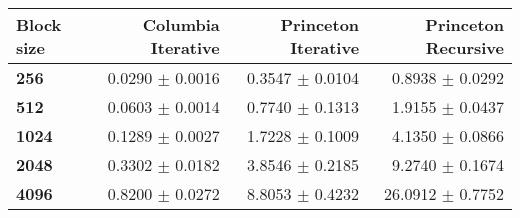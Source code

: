\begin{tabular}{lrrr}\toprule
\textbf{Block size}  & \textbf{Columbia Iterative} & \textbf{Princeton Iterative} & \textbf{Princeton Recursive}\\\midrule
\textbf{256}  & 0.0290 $\pm$ 0.0016 & 0.3547 $\pm$ 0.0104 & 0.8938 $\pm$ 0.0292\\
\textbf{512}  & 0.0603 $\pm$ 0.0014 & 0.7740 $\pm$ 0.1313 & 1.9155 $\pm$ 0.0437\\
\textbf{1024}  & 0.1289 $\pm$ 0.0027 & 1.7228 $\pm$ 0.1009 & 4.1350 $\pm$ 0.0866\\
\textbf{2048}  & 0.3302 $\pm$ 0.0182 & 3.8546 $\pm$ 0.2185 & 9.2740 $\pm$ 0.1674\\
\textbf{4096} & 0.8200 $\pm$ 0.0272 & 8.8053 $\pm$ 0.4232 & 26.0912 $\pm$ 0.7752\\
\bottomrule
\end{tabular}

